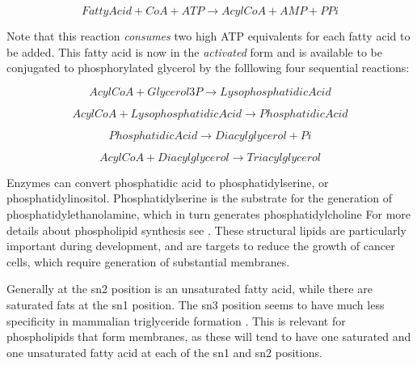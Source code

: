 \documentclass{tufte-handout}
\begin{document}
\begin{equation}
Fatty Acid + CoA +  ATP \rightarrow AcylCoA + AMP + PPi
\end{equation}

Note that this reaction \emph{consumes} two high ATP equivalents for each fatty acid to be added.  This fatty acid is now in the \emph{activated} form and is available to be conjugated to phosphorylated glycerol by the folllowing four sequential reactions:

\begin{equation}\label{eq:gpat}
AcylCoA + Glycerol3P \rightarrow Lysophosphatidic Acid
\end{equation}

\begin{equation}\label{eq:LPAT}
AcylCoA+ Lysophosphatidic Acid \rightarrow Phosphatidic Acid
\end{equation}

\begin{equation}\label{eq:lipin}
Phosphatidic Acid \rightarrow Diacylglycerol + Pi
\end{equation}

\begin{equation}
AcylCoA + Diacylglycerol \rightarrow Triacylglycerol
\end{equation}

  Enzymes can convert phosphatidic acid to phosphatidylserine, or phosphatidylinositol.  Phosphatidylserine is the substrate for the generation of phosphatidylethanolamine, which in turn generates phosphatidylcholine  For more details about phospholipid synthesis see \citet{Kent1995}.  These structural lipids are particularly important during development, and are targets to reduce the growth of cancer cells, which require generation of substantial membranes.  

  Generally at the sn2 position is an unsaturated fatty acid, while there are saturated fats at the sn1 position.  The sn3 position seems to have much less specificity in mammalian triglyceride formation \citep{Brockerhoff1971}.  This is relevant for phospholipids that form membranes, as these will tend to have one saturated and one unsaturated fatty acid at each of the sn1 and sn2 positions.  
\end{document}
